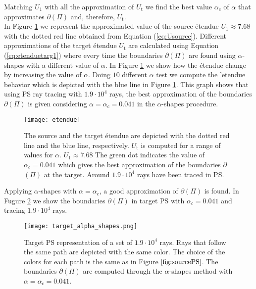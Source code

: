 Matching $U_1$ with all the approximation of $U_{\textrm{t}}$ we find the best value $\alpha_c$ of $\alpha$ that approximates $\partial$$(\Pi)$ and, therefore, $U_{\textrm{t}}$. \\ \indent In Figure \ref{fig:etendueTS} we represent the approximated value of the source \'{e}tendue $U_1\approx 7.68$ with the dotted red line obtained from Equation (\ref{eq:Usource}). Different approximations of the target \'{e}tendue $U_{\textrm{t}}$ are calculated using Equation (\ref{eq:etenduetarg1}) where every time the boundaries $\partial$$(\Pi)$ are found using $\alpha$-shapes with a different value of $\alpha$. In Figure \ref{fig:etendueTS} we show how the \'{e}tendue change by increasing the value of $\alpha$. Doing $10$ different $\alpha$ test we compute the '{e}tendue behavior which is depicted with the blue line in Figure \ref{fig:etendueTS}. This graph    
shows that using PS ray tracing with $1.9\cdot 10^4$ rays, the best approximation of the boundaries $\partial$$(\Pi)$ is given considering $\alpha = \alpha_c = 0.041$ in the $\alpha$-shapes procedure.
 \begin{figure}[h]
  \begin{center}
  \texttt{[image: etendue]}
  \end{center}
  \caption{\footnotesize{The source and the target \'{e}tendue are depicted with the dotted red line and the blue line, respectively.
  $U_\textrm{t}$ is computed for a range of values for $\alpha$. $U_1 \approx 7.68$
   The green dot indicates the value of $\alpha_c = 0.041$ which gives the best approximation of the boundaries $\partial$$(\Pi)$ at the target.
   Around $1.9 \cdot 10^4$ rays have been traced in PS.
  }}
  \label{fig:etendueTS}
\end{figure}
Applying $\alpha$-shapes with $\alpha=\alpha_c$, a good approximation of $\partial$$(\Pi)$ is found. In Fugure \ref{fig:targetPS} we show the boundaries 
$\partial$$(\Pi)$ in target PS  with $\alpha_c=0.041$ and tracing $1.9\cdot10^4$ rays.
  \begin{figure}[h]
  \begin{center}
  \texttt{[image: target\_alpha\_shapes.png]}
  \end{center}
  \caption{\footnotesize{Target PS representation of a set of $1.9 \cdot 10^4$ rays.
  Rays that follow the same path are depicted with the same color. The choice of the colors for each path is the same as in Figure $\ref{fig:sourcePS}$. The boundaries $\partial$$(\Pi)$ are computed through the $\alpha$-shapes method with $\alpha = \alpha_c = 0.041$.}}
  \label{fig:targetPS}
\end{figure}
